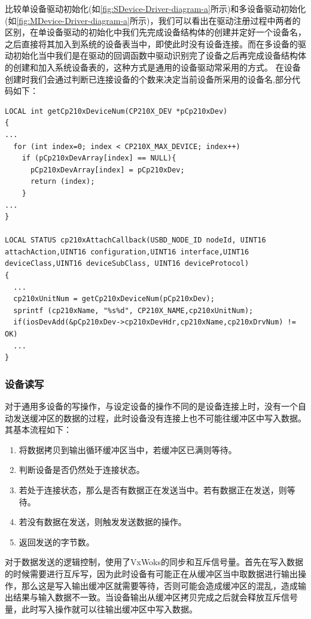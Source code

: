 	比较单设备驱动初始化(如\autoref{fig:SDevice-Driver-diagram-a}所示)和多设备驱动初始化(如\autoref{fig:MDevice-Driver-diagram-a}所示)，我们可以看出在驱动注册过程中两者的区别，在单设备驱动的初始化中我们先完成设备结构体的创建并定好一个设备名，之后直接将其加入到系统的设备表当中，即使此时没有设备连接。而在多设备的驱动初始化当中我们是在驱动的回调函数中驱动识别完了设备之后再完成设备结构体的创建和加入系统设备表的，这种方式是通用的设备驱动常采用的方式。
	在设备创建时我们会通过判断已连接设备的个数来决定当前设备所采用的设备名,部分代码如下：

\lstset{language=C}
\begin{lstlisting}
LOCAL int getCp210xDeviceNum(CP210X_DEV *pCp210xDev)
{
...
  for (int index=0; index < CP210X_MAX_DEVICE; index++)
    if (pCp210xDevArray[index] == NULL){
      pCp210xDevArray[index] = pCp210xDev;
      return (index);
    }
...
}
	
LOCAL STATUS cp210xAttachCallback(USBD_NODE_ID nodeId, UINT16 attachAction,UINT16 configuration,UINT16 interface,UINT16 deviceClass,UINT16 deviceSubClass, UINT16 deviceProtocol)
{
  ...
  cp210xUnitNum = getCp210xDeviceNum(pCp210xDev);
  sprintf (cp210xName, "%s%d", CP210X_NAME,cp210xUnitNum);
  if(iosDevAdd(&pCp210xDev->cp210xDevHdr,cp210xName,cp210xDrvNum) != OK)
  ...
}
\end{lstlisting}

\subsubsection{设备读写}
	对于通用多设备的写操作，与设定设备的操作不同的是设备连接上时，没有一个自动发送缓冲区的数据的过程，此时设备没有连接上也不可能往缓冲区中写入数据。其基本流程如下：	
	
	\begin{enumerate}
	\item 将数据拷贝到输出循环缓冲区当中，若缓冲区已满则等待。
	\item 判断设备是否仍然处于连接状态。
	\item 若处于连接状态，那么是否有数据正在发送当中。若有数据正在发送，则等待。
	\item 若没有数据在发送，则触发发送数据的操作。
	\item 返回发送的字节数。
	\end{enumerate}
	
	对于数据发送的逻辑控制，使用了VxWoks的同步和互斥信号量。首先在写入数据的时候需要进行互斥写，因为此时设备有可能正在从缓冲区当中取数据进行输出操作，那么这是写入输出缓冲区就需要等待，否则可能会造成缓冲区的混乱，造成输出结果与输入数据不一致。当设备输出从缓冲区拷贝完成之后就会释放互斥信号量，此时写入操作就可以往输出缓冲区中写入数据。
	
